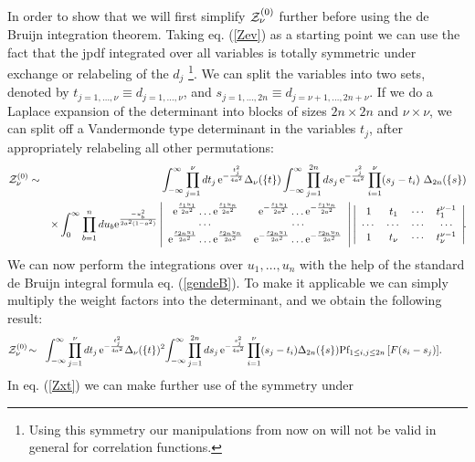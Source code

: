 \documentclass[11pt]{article}
\newcommand{\bea}{\begin{eqnarray}}
\newcommand{\eea}{\end{eqnarray}}
\newcommand{\nn}{\nonumber}
\newcommand{\e}{\mbox{e}}
\def\Pf{\mbox{Pf}}
\begin{document}
\begin{appendix}
In order to show that we will first simplify ${\cal Z}_\nu^{(0)}$
further before using the de Bruijn integration theorem. Taking
eq. (\ref{Zev}) as a starting point we can use the fact that the jpdf
integrated over all variables 
is totally symmetric under exchange or relabeling of the
$d_j$ \footnote{Using this symmetry our manipulations from now on will
  not be valid 
in general for correlation functions.}.
We can split the variables into two sets, denoted by
$t_{j=1,\ldots,\nu}\equiv d_{j=1,\ldots,\nu}$, and
$s_{j=1,\ldots,2n}\equiv d_{j=\nu+1,\ldots,2n+\nu}$. If we do a Laplace
expansion of the determinant into blocks of sizes $2n\times 2n$ and
$\nu\times\nu$, we can split off a Vandermonde type determinant in the
variables $t_j$, after appropriately relabeling all other permutations:
\bea
{\cal Z}_\nu^{(0)} &\sim&
\int_{-\infty}^\infty\prod_{j=1}^{\nu}
dt_j\,\e^{-\frac{t_j^2}{4a^2}}
\Delta_{\nu}(\{t\})
\int_{-\infty}^\infty\prod_{j=1}^{2n}
ds_j\,\e^{-\frac{s_j^2}{4a^2}}\prod_{i=1}^{\nu}(s_j-t_i)
\ \Delta_{2n}(\{s\})
\label{ZprePf}\\
&&\times
\int_0^\infty\prod_{b=1}^{n} du_b
\e^{\frac{- u_b^2}{2a^2(1-a^2)}}
\left|
\begin{array}{cc}
\e^{\frac{s_1u_1}{2a^2}}\ldots
\e^{\frac{s_1u_n}{2a^2}}&\e^{-\frac{s_1u_1}{2a^2}}\ldots
\e^{-\frac{s_1u_n}{2a^2}}\\ 
\cdots          & \cdots\\
\e^{\frac{s_{2n}u_1}{2a^2}}\ldots\e^{\frac{s_{2n}u_n}{2a^2}}
&\e^{-\frac{s_{2n}u_1}{2a^2}}\ldots\e^{-\frac{s_{2n}u_n}{2a^2}}\\  
\end{array}\right|
\left|
\begin{array}{cccc}
1&{t_1}&\cdots&t_1^{\nu-1}\\
\cdots&\cdots          &\cdots& \cdots\\
1&t_{\nu}&\cdots &t_{\nu}^{\nu-1}
\end{array}\right|\!\!.\nn
\eea
We can now perform the integrations over $u_{1},\ldots,u_n$
with the help of the standard de Bruijn integral formula eq. (\ref{gendeB}).
To make it applicable we can simply multiply the weight factors into the
determinant, and we obtain the following result:
\bea
{\cal Z}_\nu^{(0)}\! &\sim&\!
\int_{-\infty}^\infty\prod_{j=1}^{\nu}
dt_j\,\e^{-\frac{t_j^2}{4a^2}}
\Delta_{\nu}(\{t\})^2\!
\int_{-\infty}^\infty\prod_{j=1}^{2n}
ds_j\,\e^{-\frac{s_j^2}{4a^2}}\prod_{i=1}^{\nu}(s_j-t_i)
\Delta_{2n}(\{s\})
\Pf_{1\leq i,j\leq 2n}\left[F(s_i-s_j)
\right]\!.\ \ \ \ \ \ \ 
\label{Zxt}
\eea
In eq. (\ref{Zxt}) we can make further use of the symmetry under

\end{appendix}
\end{document}
